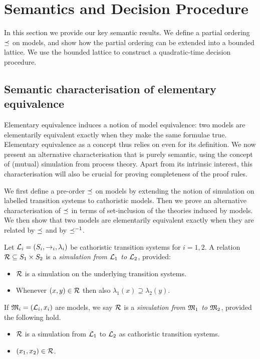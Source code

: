 \section{Semantics and Decision Procedure}\label{elAndBangCore}

In this section we provide our key semantic results.  We define a
partial ordering $\preceq$ on models, and show how the partial
ordering can be extended into a bounded lattice.  We use the bounded
lattice to construct a quadratic-time decision procedure.

\subsection{Semantic characterisation of elementary equivalence}\label{elementaryEquivalence}

Elementary equivalence induces a notion of model equivalence: two
models are elementarily equivalent exactly when they make the same
formulae true. Elementary equivalence as a concept thus relies on
\cathoristic{} even for its definition. We now present an alternative
characterisation that is purely semantic, using the concept of
(mutual) simulation from process theory. Apart from its intrinsic
interest, this characterisation will also be crucial for proving
completeness of the proof rules.

We first define a pre-order $\preceq$ on models by extending the
notion of simulation on labelled transition systems to cathoristic
models. Then we prove an alternative characterisation of $\preceq$
in terms of set-inclusion of the theories induced by models. We then
show that two models are elementarily equivalent exactly when they are
related by $\preceq$ and by $\preceq^{-1}$.

\begin{definition}
Let $\mathcal{L}_i = (S_i, \rightarrow_i, \lambda_i)$ be cathoristic transition
systems for $i = 1, 2$.  A relation $\mathcal{R} \subseteq S_1 \times S_2$ is
a \emph{simulation from $\mathcal{L}_1$ to $\mathcal{L}_2$}, provided:
\begin{itemize} 

\item $\mathcal{R}$ is a simulation on the underlying transition systems. 

\item Whenever $(x, y) \in \mathcal{R}$ then also $\lambda_1(x) \supseteq
  \lambda_2(y)$.

\end{itemize}

\NI If $\frak{M}_i = (\mathcal{L}_i, x_i)$ are models, we say $\mathcal{R}$ is a
\emph{simulation from $\frak{M}_1$ to $\frak{M}_2$}, provided the following hold.

\begin{itemize}

\item $\mathcal{R}$ is a simulation from $\mathcal{L}_1$ to $\mathcal{L}_2$ as cathoristic transition systems.

\item  $(x_1, x_2) \in \mathcal{R}$. 

\end{itemize}

\end{definition}

